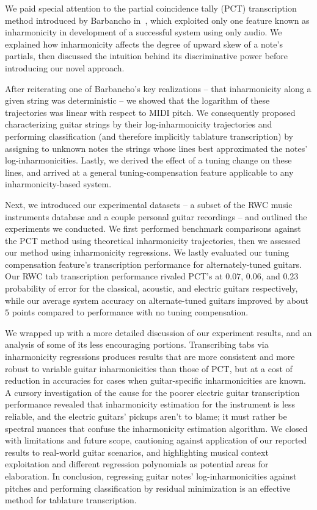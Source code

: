 \documentclass[12pt]{cmuthesis}
\begin{document}
We paid special attention to the partial coincidence tally (PCT) transcription method introduced by Barbancho in~\cite{barbanchoi2012}, which exploited only one feature known as inharmonicity in development of a successful system using only audio. We explained how inharmonicity affects the degree of upward skew of a note's partials, then discussed the intuition behind its discriminative power before introducing our novel approach.

After reiterating one of Barbancho's key realizations -- that inharmonicity along a given string was deterministic -- we showed that the logarithm of these trajectories was linear with respect to MIDI pitch. We consequently proposed characterizing guitar strings by their log-inharmonicity trajectories and performing classification (and therefore implicitly tablature transcription) by assigning to unknown notes the strings whose lines best approximated the notes' log-inharmonicities. Lastly, we derived the effect of a tuning change on these lines, and arrived at a general tuning-compensation feature applicable to any inharmonicity-based system.

Next, we introduced our experimental datasets -- a subset of the RWC music instruments database and a couple personal guitar recordings -- and outlined the experiments we conducted. We first performed benchmark comparisons against the PCT method using theoretical inharmonicity trajectories, then we assessed our method using inharmonicity regressions. We lastly evaluated our tuning compensation feature's transcription performance for alternately-tuned guitars. Our RWC tab transcription performance rivaled PCT's at $0.07$, $0.06$, and $0.23$ probability of error for the classical, acoustic, and electric guitars respectively, while our average system accuracy on alternate-tuned guitars improved by about $5$ points compared to performance with no tuning compensation.

We wrapped up with a more detailed discussion of our experiment results, and an analysis of some of its less encouraging portions. Transcribing tabs via inharmonicity regressions produces results that are more consistent and more robust to variable guitar inharmonicities than those of PCT, but at a cost of reduction in accuracies for cases when guitar-specific inharmonicities are known. A cursory investigation of the cause for the poorer electric guitar transcription performance revealed that inharmonicity estimation for the instrument is less reliable, and the electric guitars' pickups aren't to blame; it must rather be spectral nuances that confuse the inharmonicity estimation algorithm. We closed with limitations and future scope, cautioning against application of our reported results to real-world guitar scenarios, and highlighting musical context exploitation and different regression polynomials as potential areas for elaboration. In conclusion, regressing guitar notes' log-inharmonicities against pitches and performing classification by residual minimization is an effective method for tablature transcription.
\end{document}
